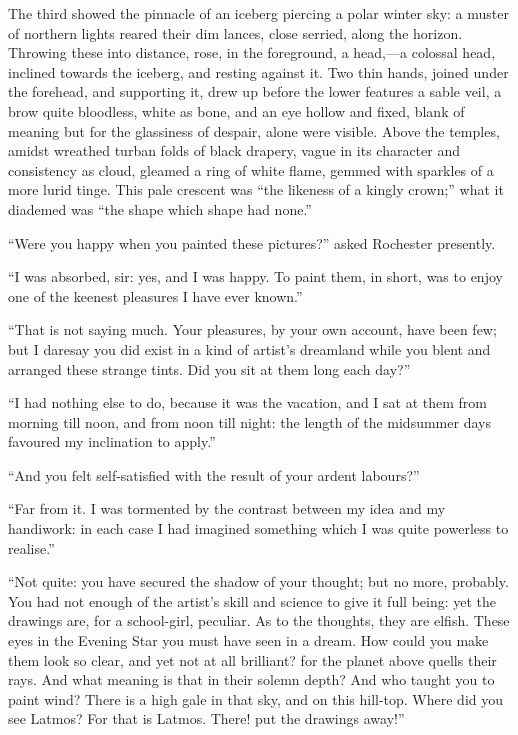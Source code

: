 The third showed the pinnacle of an iceberg piercing a polar winter sky:
a muster of northern lights reared their dim lances, close serried,
along the horizon. Throwing these into distance, rose, in the
foreground, a head,---a colossal head, inclined towards the iceberg, and
resting against it. Two thin hands, joined under the forehead, and
supporting it, drew up before the lower features a sable veil, a brow
quite bloodless, white as bone, and an eye hollow and fixed, blank of
meaning but for the glassiness of despair, alone were visible. Above
the temples, amidst wreathed turban folds of black drapery, vague in its
character and consistency as cloud, gleamed a ring of white flame,
gemmed with sparkles of a more lurid tinge. This pale crescent was
\enquote{the likeness of a kingly crown;} what it diademed was
\enquote{the shape which shape had none.}

\enquote{Were you happy when you painted these pictures?} asked \Mr{}
Rochester presently.

\enquote{I was absorbed, sir: yes, and I was happy. To paint them, in
	short, was to enjoy one of the keenest pleasures I have ever known.}

\enquote{That is not saying much. Your pleasures, by your own account,
	have been few; but I daresay you did exist in a kind of artist's
	dreamland while you blent and arranged these strange tints. Did you sit
	at them long each day?}

\enquote{I had nothing else to do, because it was the vacation, and I
	sat at them from morning till noon, and from noon till night: the length
	of the midsummer days favoured my inclination to apply.}

\enquote{And you felt self-satisfied with the result of your ardent
	labours?}

\enquote{Far from it. I was tormented by the contrast between my idea
	and my handiwork: in each case I had imagined something which I was
	quite powerless to realise.}

\enquote{Not quite: you have secured the shadow of your thought; but no
	more, probably. You had not enough of the artist's skill and science to
	give it full being: yet the drawings are, for a school-girl, peculiar.
	As to the thoughts, they are elfish. These eyes in the Evening Star you
	must have seen in a dream. How could you make them look so clear, and
	yet not at all brilliant? for the planet above quells their rays. And
	what meaning is that in their solemn depth? And who taught you to paint
	wind? There is a high gale in that sky, and on this hill-top. Where
	did you see Latmos? For that is Latmos. There! put the drawings away!}

